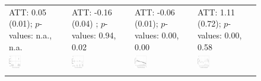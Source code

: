\documentclass[12pt]{article}
\begin{document}
\begin{figure}[!ht]
\begin{minipage}{1\linewidth}
{{\begin{tabular}{C{3.8cm}C{3.8cm}C{3.8cm}C{3.8cm}}
   \citet{Schubiger2021} \newline ATT: 0.05 (0.01); \newline $p$-values: n.a., n.a.  & 
   \citet{Schuit2017} \newline  ATT:  -0.16 (0.04) ; \newline $p$-values:  0.94, 0.02 &
   \citet{Trounstine2020} \newline ATT: -0.06 (0.01); \newline $p$-values: 0.00, 0.00  &   
   \citet{Weschle2021} \newline ATT: 1.11 (0.72); \newline $p$-values: 0.00, 0.58\\
   \hspace{-2em}\includegraphics[width = 0.22\textwidth]{figure/fect/Schubiger_fect_entry.png} &
   \hspace{-2em}\includegraphics[width = 0.22\textwidth]{figure/fect/Schuit_fect_entry.png} &
   \hspace{-2em} \includegraphics[width = 0.22\textwidth]{figure/fect/trounstine_fect_entry.png} &
      \hspace{-2em} \includegraphics[width = 0.22\textwidth]{figure/fect/weschle_fect_entry.png}\\ \\

\end{tabular}}}
\end{minipage}
\end{figure}
\end{document}
